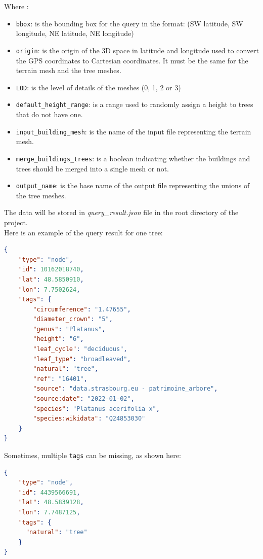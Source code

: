 \documentclass[12pt]{article}
\begin{document}
Where :
\begin{itemize}
    \item \texttt{bbox}: is the bounding box for the query in the format:
    \subitem (SW latitude, SW longitude, NE latitude, NE longitude)
    \item \texttt{origin}: is the origin of the 3D space in latitude and longitude
    used to convert the GPS coordinates to Cartesian coordinates. It must be the
    same for the terrain mesh and the tree meshes.
    \item \texttt{LOD}: is the level of details of the meshes (0, 1, 2 or 3)
    \item \texttt{default\_height\_range}: is a range used to randomly assign a
    height to trees that do not have one.
    \item \texttt{input\_building\_mesh}: is the name of the input file
    representing the terrain mesh.
    \item \texttt{merge\_buildings\_trees}: is a boolean indicating whether the
    buildings and trees should be merged into a single mesh or not.
    \item \texttt{output\_name}: is the base name of the output file
    representing the unions of the tree meshes.
\end{itemize}

The data will be stored in \textit{query\_result.json} file in the root directory
 of the project. \\
Here is an example of the query result for one tree:

\begin{lstlisting}[language=json]
{
    "type": "node",
    "id": 10162018740,
    "lat": 48.5850910,
    "lon": 7.7502624,
    "tags": {
        "circumference": "1.47655",
        "diameter_crown": "5",
        "genus": "Platanus",
        "height": "6",
        "leaf_cycle": "deciduous",
        "leaf_type": "broadleaved",
        "natural": "tree",
        "ref": "16401",
        "source": "data.strasbourg.eu - patrimoine_arbore",
        "source:date": "2022-01-02",
        "species": "Platanus acerifolia x",
        "species:wikidata": "Q24853030"
    }
}
\end{lstlisting}

Sometimes, multiple \texttt{tags} can be missing, as shown here:

\begin{lstlisting}[language=json]
{
    "type": "node",
    "id": 4439566691,
    "lat": 48.5839128,
    "lon": 7.7487125,
    "tags": {
      "natural": "tree"
    }
}
\end{lstlisting}
\end{document}
